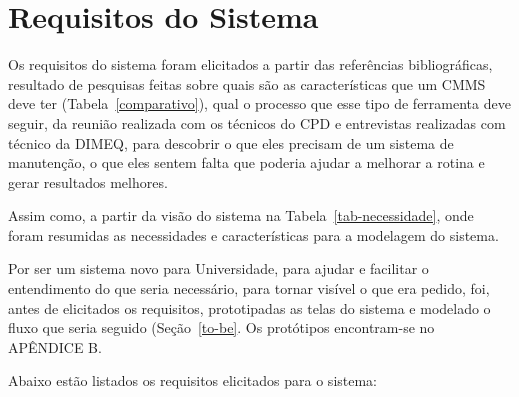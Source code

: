 
\section{Requisitos do Sistema}

Os requisitos do sistema foram elicitados a partir das referências bibliográficas, resultado de pesquisas feitas sobre quais são as características que um CMMS deve ter (Tabela~\ref{comparativo}), qual o processo que esse tipo de ferramenta deve seguir, da reunião realizada com os técnicos do CPD e entrevistas realizadas com técnico da DIMEQ, para descobrir o que eles precisam de um sistema de manutenção, o que eles sentem falta que poderia ajudar a melhorar a rotina e gerar resultados melhores.

Assim como, a partir da visão do sistema na Tabela~\ref{tab-necessidade}, onde foram resumidas as necessidades e características para a modelagem do sistema. 

Por ser um sistema novo para Universidade, para ajudar e facilitar o entendimento do que seria necessário, para tornar visível o que era pedido, foi, antes de elicitados os requisitos, prototipadas as telas do sistema e modelado o fluxo que seria seguido (Seção~\ref{to-be}. Os protótipos encontram-se no APÊNDICE B.

Abaixo estão listados os requisitos elicitados para o sistema:

